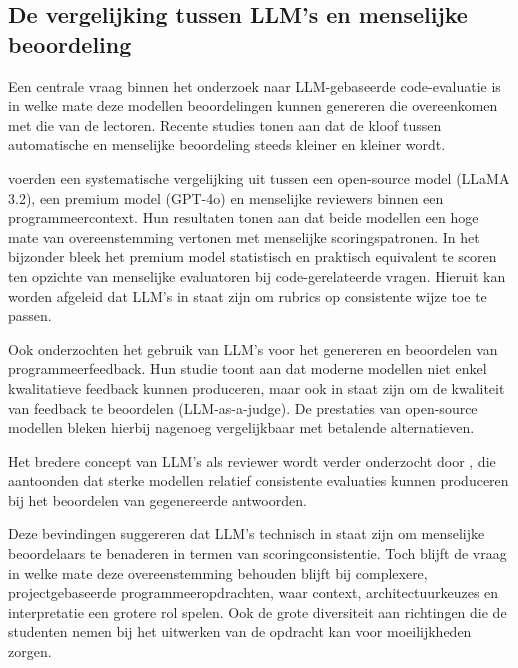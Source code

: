 \subsection{De vergelijking tussen LLM's en menselijke beoordeling}

Een centrale vraag binnen het onderzoek naar LLM-gebaseerde code-evaluatie is in welke mate deze modellen beoordelingen kunnen genereren die overeenkomen met die van de lectoren. Recente studies tonen aan dat de kloof tussen automatische en menselijke beoordeling steeds kleiner en kleiner wordt.

\vspace{1em}

\textcite{Mendonca2025} voerden een systematische vergelijking uit tussen een open-source model (LLaMA 3.2), een premium model (GPT-4o) en menselijke reviewers binnen een programmeercontext. Hun resultaten tonen aan dat beide modellen een hoge mate van overeenstemming vertonen met menselijke scoringspatronen. In het bijzonder bleek het premium model statistisch en praktisch equivalent te scoren ten opzichte van menselijke evaluatoren bij code-gerelateerde vragen. Hieruit kan worden afgeleid dat LLM’s in staat zijn om rubrics op consistente wijze toe te passen.

\vspace{1em}

Ook \textcite{Koutcheme2025} onderzochten het gebruik van LLM’s voor het genereren en beoordelen van programmeerfeedback. Hun studie toont aan dat moderne modellen niet enkel kwalitatieve feedback kunnen produceren, maar ook in staat zijn om de kwaliteit van feedback te beoordelen (LLM-as-a-judge). De prestaties van open-source modellen bleken hierbij nagenoeg vergelijkbaar met betalende alternatieven.

\vspace{1em}

Het bredere concept van LLM’s als reviewer wordt verder onderzocht door \textcite{Eric2023}, die aantoonden dat sterke modellen relatief consistente evaluaties kunnen produceren bij het beoordelen van gegenereerde antwoorden. 

\vspace{1em}

Deze bevindingen suggereren dat LLM’s technisch in staat zijn om menselijke beoordelaars te benaderen in termen van scoringconsistentie. Toch blijft de vraag in welke mate deze overeenstemming behouden blijft bij complexere, projectgebaseerde programmeeropdrachten, waar context, architectuurkeuzes en interpretatie een grotere rol spelen. Ook de grote diversiteit aan richtingen die de studenten nemen bij het uitwerken van de opdracht kan voor moeilijkheden zorgen.

